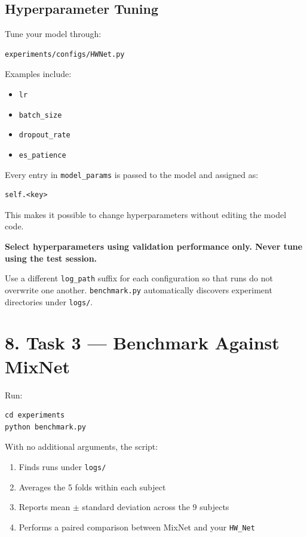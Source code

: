 \documentclass[
  10pt,
]{article}
\begin{document}
\subsection{Hyperparameter Tuning}\label{hyperparameter-tuning}

Tune your model through:

\begin{verbatim}
experiments/configs/HWNet.py
\end{verbatim}

Examples include:

\begin{itemize}
\item
  \texttt{lr}
\item
  \texttt{batch\_size}
\item
  \texttt{dropout\_rate}
\item
  \texttt{es\_patience}
\end{itemize}

Every entry in \texttt{model\_params} is passed to the model and
assigned as:

\begin{verbatim}
self.<key>
\end{verbatim}

This makes it possible to change hyperparameters without editing the
model code.

\textbf{Select hyperparameters using validation performance only.
Never tune using the test session.}

Use a different \texttt{log\_path} suffix for each configuration so
that runs do not overwrite one another. \texttt{benchmark.py}
automatically discovers experiment directories under \texttt{logs/}.

\section{8. Task 3 --- Benchmark Against
MixNet}\label{task-3-benchmark-against-mixnet}

Run:

\begin{verbatim}
cd experiments
python benchmark.py
\end{verbatim}

With no additional arguments, the script:

\begin{enumerate}
\def\labelenumi{\arabic{enumi}.}
\item
  Finds runs under \texttt{logs/}
\item
  Averages the 5 folds within each subject
\item
  Reports mean $\pm$ standard deviation across the 9 subjects
\item
  Performs a paired comparison between MixNet and your
  \texttt{HW\_Net}
\end{enumerate}
\end{document}
